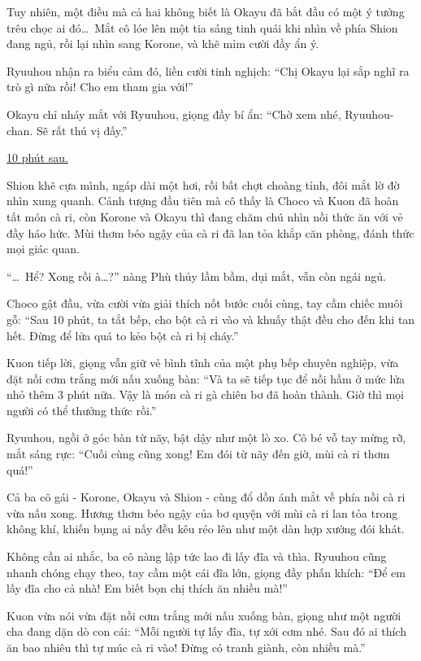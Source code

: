 \documentclass[../main.tex]{subfiles}
\begin{document}
Tuy nhiên, một điều mà cả hai không biết là Okayu đã bắt đầu có một ý tưởng trêu chọc ai đó\dots\ Mắt cô lóe lên một tia sáng tinh quái khi nhìn về phía Shion đang ngủ, rồi lại nhìn sang Korone, và khẽ mỉm cười đầy ẩn ý.

Ryuuhou nhận ra biểu cảm đó, liền cười tinh nghịch: ``Chị Okayu lại sắp nghĩ ra trò gì nữa rồi! Cho em tham gia với!''

Okayu chỉ nháy mắt với Ryuuhou, giọng đầy bí ẩn: ``Chờ xem nhé, Ryuuhou-chan. Sẽ rất thú vị đấy.''

\begin{center}
    \uline{10 phút sau.}
\end{center}

Shion khẽ cựa mình, ngáp dài một hơi, rồi bất chợt choàng tỉnh, đôi mắt lờ đờ nhìn xung quanh. Cảnh tượng đầu tiên mà cô thấy là Choco và Kuon đã hoàn tất món cà ri, còn Korone và Okayu thì đang chăm chú nhìn nồi thức ăn với vẻ đầy háo hức. Mùi thơm béo ngậy của cà ri đã lan tỏa khắp căn phòng, đánh thức mọi giác quan.

``\dots\ Hể? Xong rồi à\dots?'' nàng Phù thủy lầm bầm, dụi mắt, vẫn còn ngái ngủ.

Choco gật đầu, vừa cười vừa giải thích nốt bước cuối cùng, tay cầm chiếc muôi gỗ: ``Sau 10 phút, ta tắt bếp, cho bột cà ri vào và khuấy thật đều cho đến khi tan hết. Đừng để lửa quá to kẻo bột cà ri bị cháy.''

Kuon tiếp lời, giọng vẫn giữ vẻ bình tĩnh của một phụ bếp chuyên nghiệp, vừa đặt nồi cơm trắng mới nấu xuống bàn: ``Và ta sẽ tiếp tục để nồi hầm ở mức lửa nhỏ thêm 3 phút nữa. Vậy là món cà ri gà chiên bơ đã hoàn thành. Giờ thì mọi người có thể thưởng thức rồi.''

Ryuuhou, ngồi ở góc bàn từ nãy, bật dậy như một lò xo. Cô bé vỗ tay mừng rỡ, mắt sáng rực: ``Cuối cùng cũng xong! Em đói từ nãy đến giờ, mùi cà ri thơm quá!''

Cả ba cô gái - Korone, Okayu và Shion - cùng đổ dồn ánh mắt về phía nồi cà ri vừa nấu xong. Hương thơm béo ngậy của bơ quyện với mùi cà ri lan tỏa trong không khí, khiến bụng ai nấy đều kêu réo lên như một dàn hợp xướng đói khát.


Không cần ai nhắc, ba cô nàng lập tức lao đi lấy đĩa và thìa. Ryuuhou cũng nhanh chóng chạy theo, tay cầm một cái đĩa lớn, giọng đầy phấn khích: ``Để em lấy đĩa cho cả nhà! Em biết bọn chị thích ăn nhiều mà!''

Kuon vừa nói vừa đặt nồi cơm trắng mới nấu xuống bàn, giọng như một người cha đang dặn dò con cái: ``Mỗi người tự lấy đĩa, tự xới cơm nhé. Sau đó ai thích ăn bao nhiêu thì tự múc cà ri vào! Đừng có tranh giành, còn nhiều mà.''
\end{document}
